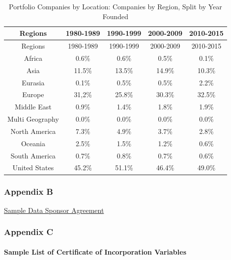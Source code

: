 \documentclass[
]{WileySix}
\begin{document}
\begin{longtable}[]{@{}ccccc@{}}
\caption{\label{tab:pcritablea3} Portfolio Companies by Location: Companies by Region, Split by Year Founded}\tabularnewline
\toprule
Regions & 1980-1989 & 1990-1999 & 2000-2009 & 2010-2015\tabularnewline
\midrule
\endfirsthead
\toprule
Regions & 1980-1989 & 1990-1999 & 2000-2009 & 2010-2015\tabularnewline
\midrule
\endhead
Africa & 0.6\% & 0.6\% & 0.5\% & 0.1\%\tabularnewline
Asia & 11.5\% & 13.5\% & 14.9\% & 10.3\%\tabularnewline
Eurasia & 0.1\% & 0.5\% & 0.5\% & 2.2\%\tabularnewline
Europe & 31,2\% & 25.8\% & 30.3\% & 32.5\%\tabularnewline
Middle East & 0.9\% & 1.4\% & 1.8\% & 1.9\%\tabularnewline
Multi Geography & 0.0\% & 0.0\% & 0.0\% & 0.0\%\tabularnewline
North America & 7.3\% & 4.9\% & 3.7\% & 2.8\%\tabularnewline
Oceania & 2.5\% & 1.5\% & 1.2\% & 0.6\%\tabularnewline
South America & 0.7\% & 0.8\% & 0.7\% & 0.6\%\tabularnewline
United States & 45.2\% & 51.1\% & 46.4\% & 49.0\%\tabularnewline
\bottomrule
\end{longtable}

\hypertarget{appendix-b-1}{%
\subsubsection*{Appendix B}\label{appendix-b-1}}

\href{./appendix/pcri_appendix_b.pdf}{Sample Data Sponsor Agreement}

\hypertarget{appendix-c}{%
\subsubsection*{Appendix C}\label{appendix-c}}

\hypertarget{sample-list-of-certificate-of-incorporation-variables}{%
\paragraph{Sample List of Certificate of Incorporation Variables}\label{sample-list-of-certificate-of-incorporation-variables}}
\end{document}
